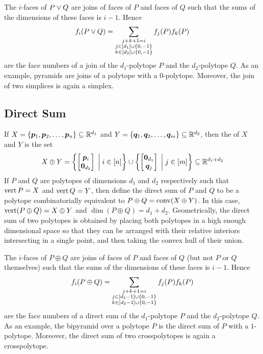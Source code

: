         The \(i\)-faces of \(P\vee Q\) are joins of faces of \(P\) and faces of \(Q\) such that the sums of the dimensions of these faces is \(i-1\).  Hence
            \[
                f_i(P\vee Q)
                    =
                        \sum_{\substack{j+k+1=i\\ j\in\left[d_1\right]\cup\left\{0,-1\right\}\\ k\in\left[d_2\right]\cup\left\{0,-1\right\}}}f_j(P)f_k(P)
            \]
        are the face numbers of a join of the \(d_1\)-polytope \(P\) and the \(d_2\)-polytope \(Q\).  As an example, pyramids are joins of a polytope with a \(0\)-polytope.  Moreover, the join of two simplices is again a simplex.
    \subsection{Direct Sum}\label{SSec:DirectSum}
        If  \(X=\left\{\bm{p}_1,\bm{p}_2,\dotsc,\bm{p}_n\right\}\subseteq\mathbb{R}^{d_1}\) and \(Y=\left\{\bm{q}_1,\bm{q}_2,\dotsc,\bm{q}_m\right\}\subseteq\mathbb{R}^{d_2}\), then the  of \(X\) and \(Y\) is the set
            \[
                X\oplus Y
                    =
                        \setb{\begin{bmatrix}\ve p_i\\\ve0_{d_2}\end{bmatrix}}{i\in\brac n}
                        \cup
                        \setb{\begin{bmatrix}\ve 0_{d_1}\\\ve q_j\end{bmatrix}}{j\in\brac m}
                    \sbset
                        \R{d_1+d_2}
            \]
        If \(P\) and \(Q\) are polytopes of dimensions \(d_1\) and \(d_2\) respectively such that \(\operatorname{vert} P=X\) and \(\operatorname{vert} Q=Y\), then define the direct sum of \(P\) and \(Q\) to be a polytope combinatorially equivalent to \(P\oplus Q=\operatorname{conv}(X\oplus Y)\).  In this case, \(\operatorname{vert}(P\oplus Q)=X\oplus Y\) and \(\dim(P\oplus Q)=d_1+d_2\).  Geometrically, the direct sum of two polytopes is obtained by placing both polytopes in a high enough dimensional space so that they can be arranged with their relative interiors intersecting in a single point, and then taking the convex hull of their union.

        The \(i\)-faces of \(P\oplus Q\) are joins of faces of \(P\) and faces of \(Q\) (but not \(P\) or \(Q\) themselves) such that the sums of the dimensions of these faces is \(i-1\).  Hence
            \[
                f_i(P\oplus Q)
                    =
                        \sum_{\substack{
                                j+k+1=i\\
                                j\in\left[d_1-1\right]\cup\left\{0,-1\right\}\\
                                k\in\left[d_2-1\right]\cup\left\{0,-1\right\}}
                                }
                            f_j(P)f_k(P)
            \]
        are the face numbers of a direct sum of the \(d_1\)-polytope \(P\) and the \(d_2\)-polytope \(Q\).  As an example, the bipyramid over a polytope \(P\) is the direct sum of \(P\) with a \(1\)-polytope.  Moreover, the direct sum of two crosspolytopes is again a crosspolytope.
